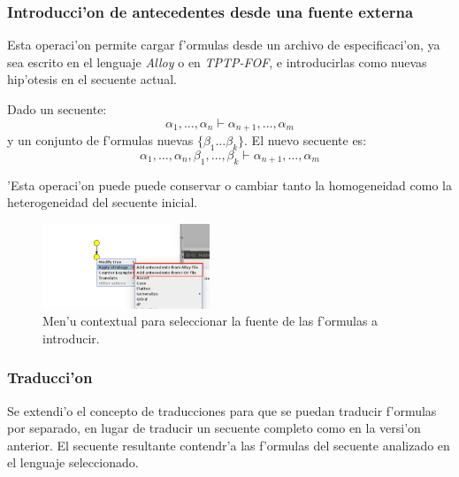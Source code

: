 \subsubsection{Introducci'on de antecedentes desde una fuente externa}

Esta operaci'on permite cargar f'ormulas desde un archivo de especificaci'on, ya sea escrito en el lenguaje \textit{Alloy} o en \textit{TPTP-FOF}, e introducirlas como nuevas hip'otesis en el secuente actual.

Dado un secuente:
$$ \alpha_1,\ldots,\alpha_n \vdash \alpha_{n+1},\ldots,\alpha_m $$
y un conjunto de f'ormulas nuevas $\{\beta_1 \ldots \beta_k\}$. El nuevo secuente es:
$$ \alpha_1,\ldots,\alpha_n,\beta_1,\ldots, \beta_k \vdash \alpha_{n+1},\ldots,\alpha_m $$

'Esta operaci'on puede puede conservar o cambiar tanto la homogeneidad como la heterogeneidad del secuente inicial.

\begin{figure}
\centering
\parbox{5cm}{
\includegraphics[width=5cm]{img/add_antecedents_1.png}	
\caption{Men'u contextual para seleccionar la fuente de las f'ormulas a introducir.}}
\end{figure}


\subsubsection{Traducci'on}

Se extendi'o el concepto de traducciones para que se puedan traducir f'ormulas por separado, en lugar de traducir un secuente completo como en la versi'on anterior.
El secuente resultante contendr'a las f'ormulas del secuente analizado en el lenguaje seleccionado.


